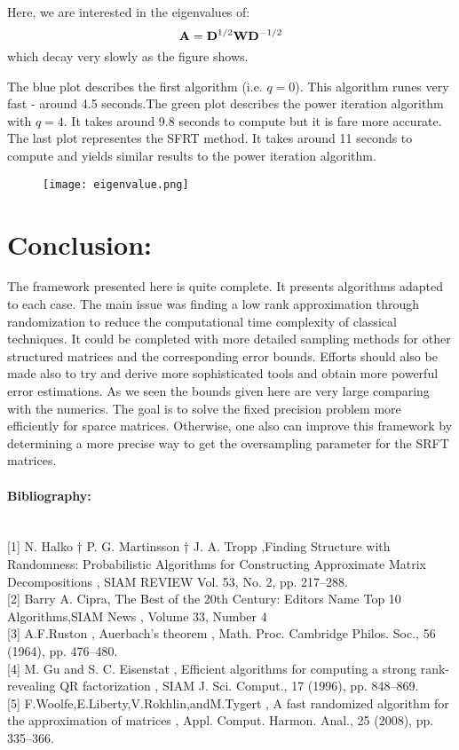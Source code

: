 \documentclass[onecolumn,11pt]{article}
\begin{document}
Here, we are interested in the eigenvalues of: 
$$\bold{A}= \bold{D}^{1/2} \bold{W} \bold{D}^{-1/2}$$
which decay very slowly as the figure shows.

The blue plot describes the first algorithm (i.e. $q=0$). This algorithm runes very fast - around 4.5 seconds.The green plot describes the power iteration algorithm with $q=4$. It takes around 9.8 seconds to compute but it is fare more accurate. The last plot representes the SFRT method. It takes around 11 seconds to compute and yields similar results to the power iteration algorithm.

\begin{figure}[h]

   \texttt{[image: eigenvalue.png]}
\end{figure}

\section{Conclusion:}

The framework presented here is quite complete. It presents algorithms adapted to each case. The main issue was finding a low rank approximation through randomization to reduce the computational time complexity of classical techniques. It could be completed with more detailed sampling methods for other structured matrices and the corresponding error bounds.
Efforts should also be made also to try and derive more sophisticated tools and obtain more powerful error estimations. As we seen the bounds given here are very large comparing with the numerics. The goal is to solve the fixed precision problem more efficiently for sparce matrices. Otherwise, one also can improve this framework by determining a more precise way to get the oversampling parameter for the SRFT matrices.

\paragraph{Bibliography:}
\ \\

[1] N. Halko
†
P. G. Martinsson
†
J. A. Tropp
,Finding Structure with Randomness:
Probabilistic Algorithms for
Constructing Approximate
Matrix Decompositions
, SIAM REVIEW
Vol. 53, No. 2, pp. 217–288.\\

[2] Barry A. Cipra, The Best of the 20th Century: Editors Name Top 10 Algorithms,SIAM News
, Volume 33, Number 4\\

[3] A.F.Ruston
,
Auerbach’s theorem
, Math. Proc. Cambridge Philos. Soc., 56 (1964), pp. 476–480.\\

[4] M. Gu and S. C. Eisenstat
,
Efficient algorithms for computing a strong rank-revealing QR
factorization
, SIAM J. Sci. Comput., 17 (1996), pp. 848–869.\\

[5] F.Woolfe,E.Liberty,V.Rokhlin,andM.Tygert
,
A fast randomized algorithm for the
approximation of matrices
, Appl. Comput. Harmon. Anal., 25 (2008), pp. 335–366.
\end{document}

